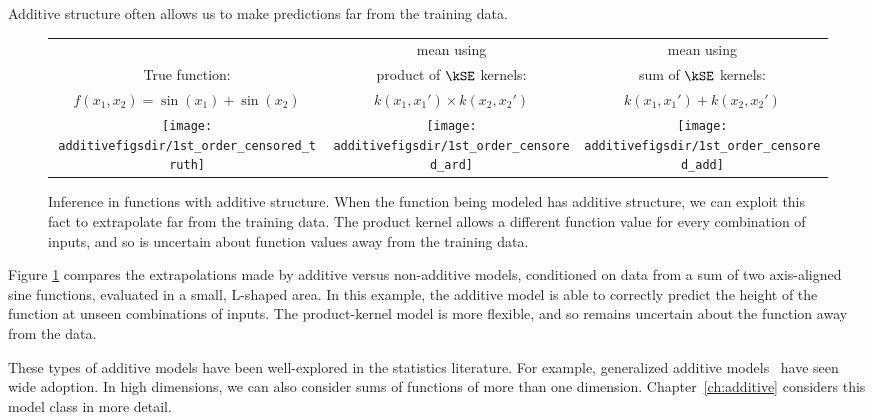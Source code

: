 Additive structure often allows us to make predictions far from the training data.
%
\begin{figure}[h!]
\centering
\begin{tabular}{ccc}
 & \gp{} mean using & \gp{} mean using \\
True function: & product of $\kSE$ kernels: & sum of $\kSE$ kernels: \\
\parbox{0.33\columnwidth}{$f(x_1, x_2) = \sin(x_1) + \sin(x_2)$} & $k(x_1, x_1') \times k(x_2, x_2')$ & $k(x_1, x_1') + k(x_2, x_2')$ \\[0.2em]
\hspace{-0.1in}\texttt{[image: \\additivefigsdir/1st\_order\_censored\_truth]} &
\hspace{-0.1in}\texttt{[image: \\additivefigsdir/1st\_order\_censored\_ard]}&
\hspace{-0.1in}\texttt{[image: \\additivefigsdir/1st\_order\_censored\_add]} \\[1em]
\end{tabular}
\caption[Long-range inference in functions with additive structure]
{Inference in functions with additive structure.
When the function being modeled has additive structure, we can exploit this fact to extrapolate far from the training data.
The product kernel allows a different function value for every combination of inputs, and so is uncertain about function values away from the training data.
}
\label{fig:synth2d}
\end{figure}
%
Figure \ref{fig:synth2d} compares the extrapolations made by additive versus non-additive \gp{} models, conditioned on data from a sum of two axis-aligned sine functions, evaluated in a small, L-shaped area.
In this example, the additive model is able to correctly predict the height of the function at unseen combinations of inputs.
The product-kernel model is more flexible, and so remains uncertain about the function away from the data.

These types of additive models have been well-explored in the statistics literature.  For example, generalized additive models~\citep{hastie1990generalized} have seen wide adoption.
In high dimensions, we can also consider sums of functions of more than one dimension.
Chapter~\ref{ch:additive} considers this model class in more detail.






